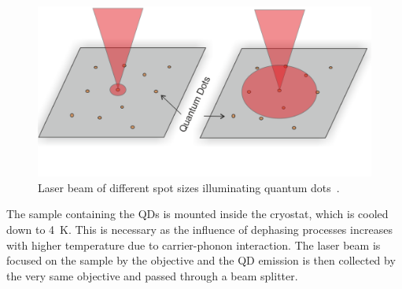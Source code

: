 \begin{figure}[H]
	\centering
	\includegraphics[width=0.7\linewidth]{figures/setup/micro-pl}
	\caption{Laser beam of different spot sizes illuminating quantum dots~\cite{reindl_characterisation_2014}.}
	\label{fig:micro-pl}
\end{figure}

The sample containing the \acp{QD} is mounted inside the cryostat, which is cooled down to \SI{4}{\kelvin}.
This is necessary as the influence of dephasing processes increases with higher temperature due to carrier-phonon interaction.
The laser beam is focused on the sample by the objective and the \ac{QD} emission is then collected by the very same objective and passed through a beam splitter.
